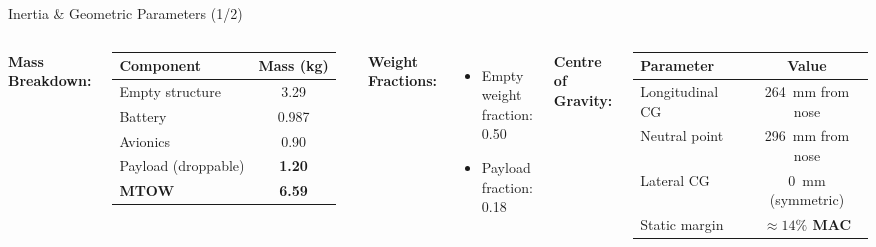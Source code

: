 \documentclass[aspectratio=169,11pt]{beamer}
\newcommand{\spec}[1]{\textcolor{navydeep}{\textbf{#1}}}
\begin{document}
\begin{frame}{Inertia \& Geometric Parameters (1/2)}

\begin{columns}[T]

  \textbf{\color{navymain}Mass Breakdown:}

  \vspace{0.2cm}
  \begin{tabular}{@{}lc@{}}
    \toprule
    \textbf{Component} & \textbf{Mass (kg)} \\
    \midrule
    Empty structure     & 3.29  \\
    Battery             & 0.987 \\
    Avionics            & 0.90  \\
    Payload (droppable) & \spec{1.20} \\
    \midrule
    \textbf{MTOW}       & \spec{6.59} \\
    \bottomrule
  \end{tabular}

  \vspace{0.35cm}
  \textbf{\color{navymain}Weight Fractions:}
  \begin{itemize}
    \item Empty weight fraction: 0.50
    \item Payload fraction: 0.18
  \end{itemize}

  \textbf{\color{navymain}Centre of Gravity:}

  \vspace{0.2cm}
  \begin{tabular}{@{}lc@{}}
    \toprule
    \textbf{Parameter} & \textbf{Value} \\
    \midrule
    Longitudinal CG  & \SI{264}{\milli\meter} from nose \\
    Neutral point     & \SI{296}{\milli\meter} from nose \\
    Lateral CG        & \SI{0}{\milli\meter} (symmetric) \\
    Static margin     & \spec{$\approx 14\%$ MAC} \\
    \bottomrule
  \end{tabular}

  \vspace{0.4cm}

\end{columns}
\end{frame}
\end{document}
